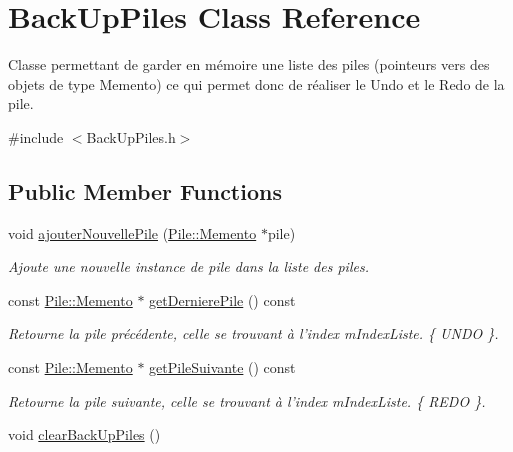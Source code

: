 \hypertarget{classBackUpPiles}{\section{\-Back\-Up\-Piles \-Class \-Reference}
\label{classBackUpPiles}
}


\-Classe permettant de garder en mémoire une liste des piles (pointeurs vers des objets de type \-Memento) ce qui permet donc de réaliser le \-Undo et le \-Redo de la pile.  




{\ttfamily \#include $<$\-Back\-Up\-Piles.\-h$>$}

\subsection*{\-Public \-Member \-Functions}
\begin{DoxyCompactItemize}
\item 
void \hyperlink{classBackUpPiles_a82adf7d399044e2bf5de8861d8a7326e}{ajouter\-Nouvelle\-Pile} (\hyperlink{classPile_1_1Memento}{\-Pile\-::\-Memento} $\ast$pile)
\begin{DoxyCompactList}\small\item\em \-Ajoute une nouvelle instance de pile dans la liste des piles. \end{DoxyCompactList}\item 
const \hyperlink{classPile_1_1Memento}{\-Pile\-::\-Memento} $\ast$ \hyperlink{classBackUpPiles_a6712c6c4a51446c1299585c7078fe3da}{get\-Derniere\-Pile} () const 
\begin{DoxyCompactList}\small\item\em \-Retourne la pile précédente, celle se trouvant à l'index m\-Index\-Liste. \{ \-U\-N\-D\-O \}. \end{DoxyCompactList}\item 
const \hyperlink{classPile_1_1Memento}{\-Pile\-::\-Memento} $\ast$ \hyperlink{classBackUpPiles_ab46243afaf7baf460bcd1eec2ec15a3b}{get\-Pile\-Suivante} () const 
\begin{DoxyCompactList}\small\item\em \-Retourne la pile suivante, celle se trouvant à l'index m\-Index\-Liste. \{ \-R\-E\-D\-O \}. \end{DoxyCompactList}\item 
void \hyperlink{classBackUpPiles_a919f7dfc07a81980442ccfc109c9cbf2}{clear\-Back\-Up\-Piles} ()
\end{DoxyCompactItemize}
